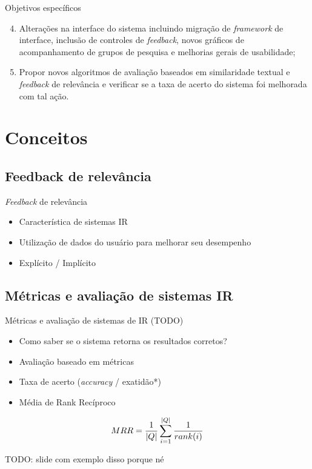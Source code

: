 \documentclass{beamer}
\begin{document}
\begin{frame}{Objetivos específicos}
  \begin{enumerate}[<+->]
    \setcounter{enumi}{3}

    \item Alterações na interface do sistema incluindo migração de \textit{framework} de interface, inclusão de controles de \textit{feedback}, novos gráficos de acompanhamento de grupos de pesquisa e melhorias gerais de usabilidade;

    \item Propor novos algoritmos de avaliação baseados em similaridade textual e \textit{feedback} de relevância e verificar se a taxa de acerto do sistema foi melhorada com tal ação.
  \end{enumerate}
\end{frame}

\section{Conceitos}

\subsection{Feedback de relevância}

\begin{frame}{\textit{Feedback} de relevância}
  \begin{itemize}
    \item Característica de sistemas IR
    \item Utilização de dados do usuário para melhorar seu desempenho
    \item Explícito / Implícito
  \end{itemize}
\end{frame}

\subsection{Métricas e avaliação de sistemas IR}

\begin{frame}{Métricas e avaliação de sistemas de IR (TODO)}
  \begin{itemize}
    \item Como saber se o sistema retorna os resultados corretos?
    \item Avaliação baseado em métricas
    \item Taxa de acerto (\textit{accuracy} / exatidão*)
    \item Média de Rank Recíproco
  \end{itemize}

  $$
  MRR = {1 \over |Q|} \sum_{i=1}^{|Q|} {1 \over rank(i)}
  $$

  TODO: slide com exemplo disso porque né
\end{frame}
\end{document}
